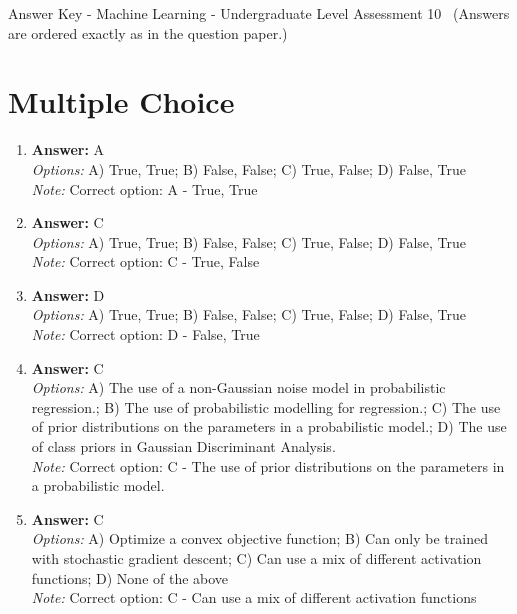 \documentclass[12pt]{article}
\begin{document}
\begin{center}
Answer Key - Machine Learning - Undergraduate Level Assessment 10 \
\small (Answers are ordered exactly as in the question paper.)
\end{center}

\section*{Multiple Choice}
\begin{enumerate}[label=\arabic*.]
\item \textbf{Answer:} A
\\ \textit{Options:} A) True, True; B) False, False; C) True, False; D) False, True
\\ \textit{Note:} Correct option: A - True, True
\item \textbf{Answer:} C
\\ \textit{Options:} A) True, True; B) False, False; C) True, False; D) False, True
\\ \textit{Note:} Correct option: C - True, False
\item \textbf{Answer:} D
\\ \textit{Options:} A) True, True; B) False, False; C) True, False; D) False, True
\\ \textit{Note:} Correct option: D - False, True
\item \textbf{Answer:} C
\\ \textit{Options:} A) The use of a non-Gaussian noise model in probabilistic regression.; B) The use of probabilistic modelling for regression.; C) The use of prior distributions on the parameters in a probabilistic model.; D) The use of class priors in Gaussian Discriminant Analysis.
\\ \textit{Note:} Correct option: C - The use of prior distributions on the parameters in a probabilistic model.
\item \textbf{Answer:} C
\\ \textit{Options:} A) Optimize a convex objective function; B) Can only be trained with stochastic gradient descent; C) Can use a mix of different activation functions; D) None of the above
\\ \textit{Note:} Correct option: C - Can use a mix of different activation functions
\end{enumerate}
\end{document}
